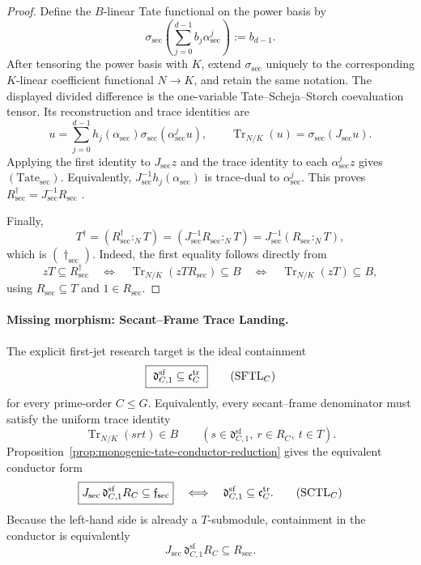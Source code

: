 \documentclass[11pt]{article}
\theoremstyle{remark}
\theoremstyle{definition}
\begin{document}
\begin{proof}
Define the \(B\)-linear Tate functional on the power basis by
\[
  \sigma_{\mathrm{sec}}
  \left(\sum_{j=0}^{d-1}b_j\alpha_{\mathrm{sec}}^j\right)
  :=b_{d-1}.
\]
After tensoring the power basis with \(K\), extend
\(\sigma_{\mathrm{sec}}\) uniquely to the corresponding \(K\)-linear
coefficient functional \(N\to K\), and retain the same notation.
The displayed divided difference is the one-variable
Tate--Scheja--Storch coevaluation tensor.  Its reconstruction and trace
identities are
\[
  u=\sum_{j=0}^{d-1}h_j(\alpha_{\mathrm{sec}})
       \sigma_{\mathrm{sec}}(\alpha_{\mathrm{sec}}^ju),
  \qquad
  \operatorname{Tr}_{N/K}(u)
  =\sigma_{\mathrm{sec}}(J_{\mathrm{sec}}u).
\]
Applying the first identity to \(J_{\mathrm{sec}}z\) and the trace identity
to each \(\alpha_{\mathrm{sec}}^jz\) gives
\((\mathrm{Tate}_{\mathrm{sec}})\).  Equivalently,
\(J_{\mathrm{sec}}^{-1}h_j(\alpha_{\mathrm{sec}})\) is trace-dual to
\(\alpha_{\mathrm{sec}}^j\).  This proves
\(R_{\mathrm{sec}}^\dagger
=J_{\mathrm{sec}}^{-1}R_{\mathrm{sec}}\)
\cite{SchejaStorch1975,StacksTateMap,StacksDedekindDifferent}.

Finally,
\[
  T^\dagger
  =(R_{\mathrm{sec}}^\dagger:_N T)
  =(J_{\mathrm{sec}}^{-1}R_{\mathrm{sec}}:_N T)
  =J_{\mathrm{sec}}^{-1}(R_{\mathrm{sec}}:_N T),
\]
which is \((\dagger_{\mathrm{sec}})\).
Indeed, the first equality follows directly from
\[
  zT\subseteq R_{\mathrm{sec}}^\dagger
  \quad\Longleftrightarrow\quad
  \operatorname{Tr}_{N/K}(zTR_{\mathrm{sec}})\subseteq B
  \quad\Longleftrightarrow\quad
  \operatorname{Tr}_{N/K}(zT)\subseteq B,
\]
using \(R_{\mathrm{sec}}\subseteq T\) and
\(1\in R_{\mathrm{sec}}\).
\end{proof}

\paragraph{Missing morphism: Secant--Frame Trace Landing.}
The explicit first-jet research target is the ideal containment
\[
  \boxed{
  \ \mathfrak d_{C,1}^{\mathrm{sf}}
  \subseteq\mathfrak c_C^{\mathrm{tr}}\ }
  \tag{\(\mathrm{SFTL}_C\)}
\]
for every prime-order \(C\leq G\).  Equivalently, every
secant--frame denominator must satisfy the uniform trace identity
\[
  \operatorname{Tr}_{N/K}(srt)\in B
  \qquad(s\in\mathfrak d_{C,1}^{\mathrm{sf}},\ r\in R_C,\ t\in T).
\]
Proposition~\ref{prop:monogenic-tate-conductor-reduction} gives the
equivalent conductor form
\[
  \boxed{
  J_{\mathrm{sec}}\,
  \mathfrak d_{C,1}^{\mathrm{sf}}R_C
  \subseteq\mathfrak f_{\mathrm{sec}}}
  \quad\Longleftrightarrow\quad
  \mathfrak d_{C,1}^{\mathrm{sf}}
  \subseteq\mathfrak c_C^{\mathrm{tr}}.
  \tag{\(\mathrm{SCTL}_C\)}
\]
Because the left-hand side is already a \(T\)-submodule, containment in
the conductor is equivalently
\[
  J_{\mathrm{sec}}\,
  \mathfrak d_{C,1}^{\mathrm{sf}}R_C
  \subseteq R_{\mathrm{sec}}.
\]
\end{document}
